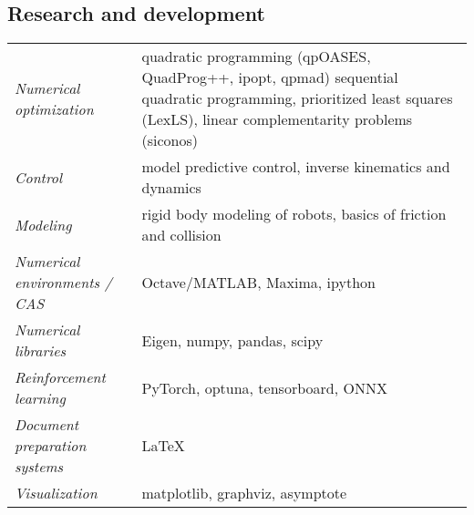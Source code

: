 \documentclass[a4paper,10pt]{report}
\begin{document}
\begin{adjustwidth}{0.5cm}{0pt}
\subsection{Research and development}
\begin{adjustwidth}{0.5cm}{0pt}
    \begin{tabularx}{\linewidth}{l X}
        {\it Numerical optimization}        & quadratic programming (qpOASES, QuadProg++, ipopt, qpmad)
                                                sequential quadratic programming, prioritized least squares (LexLS),
                                                linear complementarity problems (siconos) \\
        {\it Control}                       & model predictive control, inverse kinematics and dynamics \\
        {\it Modeling}                      & rigid body modeling of robots, basics of friction and
                                                collision \\
        {\it Numerical environments / CAS}  & Octave/MATLAB, Maxima, ipython \\
        {\it Numerical libraries}           & Eigen, numpy, pandas, scipy \\
        {\it Reinforcement learning}        & PyTorch, optuna, tensorboard, ONNX \\
        {\it Document preparation systems}  & \LaTeX \\
        {\it Visualization}                 & matplotlib, graphviz, asymptote \\
    \end{tabularx}
\end{adjustwidth}


\end{adjustwidth}
\end{document}
